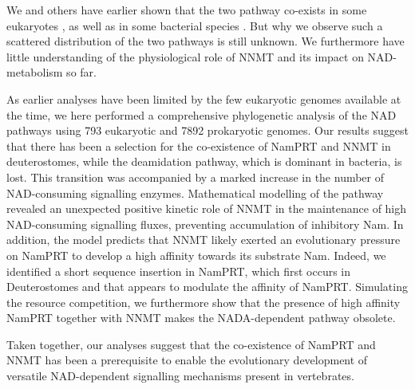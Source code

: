 We and others have earlier shown that the two pathway co-exists in some eukaryotes \citep{Gossmann2012FEBS,Carneiro2013}, as well as in some bacterial species \citep{Gazzaniga2009}. But why we observe such a scattered distribution of the two pathways is still unknown. We furthermore have little understanding of the physiological role of NNMT and its impact on NAD-metabolism so far.

As earlier analyses have been limited by the few eukaryotic genomes available at the time, we here performed a comprehensive phylogenetic analysis of the NAD pathways using 793 eukaryotic and 7892 prokaryotic genomes. Our results suggest that there has been a selection for the co-existence of NamPRT and NNMT in deuterostomes, while the deamidation pathway, which is dominant in bacteria, is lost. This transition was accompanied by a marked increase in the number of NAD-consuming signalling enzymes. Mathematical modelling of the pathway revealed an unexpected positive kinetic role of NNMT in the maintenance of high NAD-consuming signalling fluxes, preventing accumulation of inhibitory Nam. In addition, the model predicts that NNMT likely exerted an evolutionary pressure on NamPRT to develop a high affinity towards its substrate Nam. Indeed, we identified a short sequence insertion in NamPRT, which first occurs in Deuterostomes and that appears to modulate the affinity of NamPRT. Simulating the resource competition, we furthermore show that the presence of high affinity NamPRT together with NNMT makes the NADA-dependent pathway obsolete.

Taken together, our analyses suggest that the co-existence of NamPRT and NNMT has been a prerequisite to enable the evolutionary development of versatile NAD-dependent signalling mechanisms present in vertebrates.
